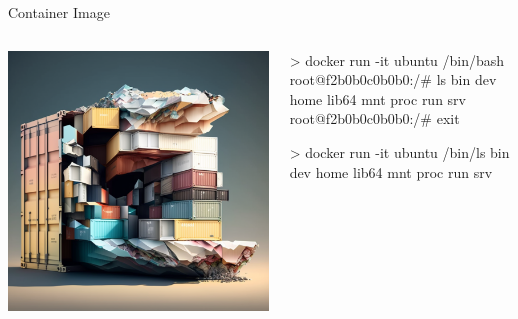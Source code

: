 \documentclass{slide}
\begin{document}
\begin{frame}[fragile]{Container Image}
    \begin{columns}
    \begin{column}{0.4\textwidth}
    \begin{center}
    \includegraphics[height=0.8\textheight]{images/container-image}

    \end{center}
    \end{column}
    \begin{column}{0.6\textwidth}
    \begin{code}[numbers=none]{}
> docker run -it ubuntu /bin/bash
root@f2b0b0c0b0b0:/# ls
bin   dev  home  lib64  mnt  proc  run   srv
root@f2b0b0c0b0b0:/# exit
    \end{code}
    \begin{code}[numbers=none]{}
> docker run -it ubuntu /bin/ls
bin   dev  home  lib64  mnt  proc  run   srv
    \end{code}
    \end{column}
    \end{columns}
\end{frame}

\end{document}
